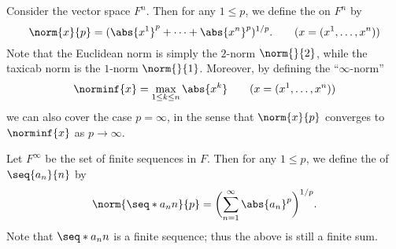 \begin{proposition}
    \label{prop:pnormint}
    \begin{alist}
        \item Consider the vector space \(F^n\).
        Then for any \(1\le p\),
        we define the  on \(F^n\) by
        \[
            \norm{x}{p}
            =(\abs{x^1}^p+\cdots+\abs{x^n}^p)^{1/p}.
            \qquad
            (x=(x^1,\dots,x^n))
        \]
        Note that
        the Euclidean norm is simply the \(2\)-norm \(\norm{}{2}\),
        while the taxicab norm is the \(1\)-norm \(\norm{}{1}\).
        Moreover, by defining the ``\(\infty\)-norm''
        \[
            \norminf{x}
            =\max_{1\le k\le n}\abs{x^k}
            \qquad
            (x=(x^1,\dots,x^n))
        \]
        we can also cover the case \(p=\infty\),
        in the sense that
        \(\norm{x}{p}\) converges to \(\norminf{x}\) as \(p\to\infty\).
        
        \item Let \(F^\infty\) be the set of finite sequences in \(F\).
        Then for any \(1\le p\),
        we define the  of \(\seq{a_n}{n}\) by
        \[
            \norm{\seq*{a_n}{n}}{p}
            =\biggl(\sum_{n=1}^{\infty}\abs{a_n}^p\biggr)^{1/p}.
        \]
        Note that \(\seq*{a_n}{n}\) is a finite sequence;
        thus the above is still a finite sum.
    \end{alist}
\end{proposition}